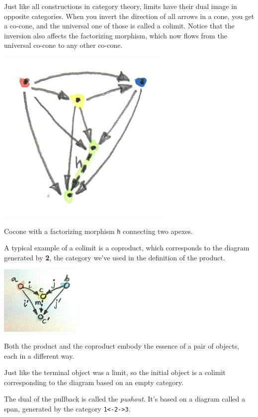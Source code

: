 Just like all constructions in category theory, limits have their dual
image in opposite categories. When you invert the direction of all
arrows in a cone, you get a co-cone, and the universal one of those is
called a colimit. Notice that the inversion also affects the factorizing
morphism, which now flows from the universal co-cone to any other
co-cone.

\hypertarget{attachment_4494}{}
\includegraphics{images/colimit.jpg}

Cocone with a factorizing morphism \texttt{h} connecting two apexes.

A typical example of a colimit is a coproduct, which corresponds to the
diagram generated by \textbf{2}, the category we've used in the
definition of the product.

\includegraphics[width=1.56250in]{images/coproductranking.jpg}

Both the product and the coproduct embody the essence of a pair of
objects, each in a different way.

Just like the terminal object was a limit, so the initial object is a
colimit corresponding to the diagram based on an empty category.

The dual of the pullback is called the \emph{pushout}. It's based on a
diagram called a span, generated by the category
\texttt{1\textless{}-2-\textgreater{}3}.

